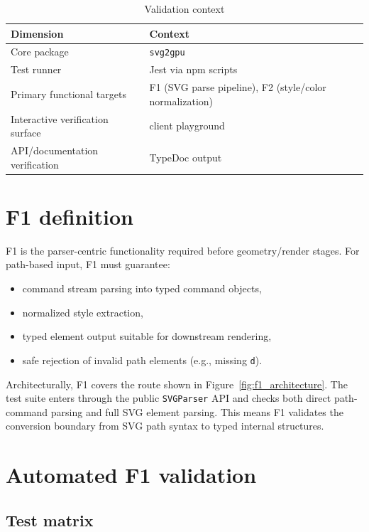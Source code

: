 \begin{table}[htbp]
\centering
\caption{Validation context}
\label{tab:validation_context_compact}
\begin{tabular}{>{\raggedright\arraybackslash}p{4.2cm} >{\raggedright\arraybackslash}p{8.4cm}}
\toprule
\textbf{Dimension} & \textbf{Context} \\
\midrule
Core package & \texttt{svg2gpu} \\
Test runner & Jest via npm scripts \\
Primary functional targets & F1 (SVG parse pipeline), F2 (style/color normalization) \\
Interactive verification surface & client playground \\
API/documentation verification & TypeDoc output \\
\bottomrule
\end{tabular}
\end{table}

\section{F1 definition}

F1 is the parser-centric functionality required before geometry/render stages.
For path-based input, F1 must guarantee:

\begin{itemize}
\item command stream parsing into typed command objects,
\item normalized style extraction,
\item typed element output suitable for downstream rendering,
\item safe rejection of invalid path elements (e.g., missing \texttt{d}).
\end{itemize}

Architecturally, F1 covers the route shown in Figure~\ref{fig:f1_architecture}.
The test suite enters through the public \texttt{SVGParser} API and checks both direct path-command parsing and full SVG element parsing.
This means F1 validates the conversion boundary from SVG path syntax to typed internal structures.

\section{Automated F1 validation}

\subsection{Test matrix}

